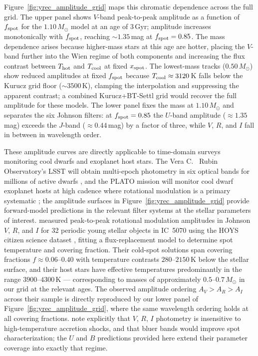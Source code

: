 \documentclass[linenumbers,apj,twocolumn, floatfix]{aastex701}
\begin{document}
Figure~\ref{fig:yrec_amplitude_grid} maps this chromatic dependence across the full grid.
The upper panel shows $V$-band peak-to-peak amplitude as a function of $f_{\rm spot}$ for the $1.10\,M_\odot$ model at an age of 3\,Gyr; amplitude increases monotonically with $f_{\rm spot}$, reaching $\sim 1.35$\,mag at $f_{\rm spot} = 0.85$.
The mass dependence arises because higher-mass stars at this age are hotter, placing the $V$-band further into the Wien regime of both components and increasing the flux contrast between $T_{\rm hot}$ and $T_{\rm cool}$ at fixed $x_{\rm spot}$.
The lowest-mass tracks ($0.50\,M_\odot$) show reduced amplitudes at fixed $f_{\rm spot}$ because $T_{\rm cool} \approx 3120$\,K falls below the Kurucz grid floor ($\sim 3500$\,K), clamping the interpolation and suppressing the apparent contrast; a combined Kurucz+BT-Settl grid would recover the full amplitude for these models.
The lower panel fixes the mass at $1.10\,M_\odot$ and separates the six Johnson filters: at $f_{\rm spot} = 0.85$ the $U$-band amplitude ($\approx 1.35$\,mag) exceeds the $J$-band ($\approx 0.44$\,mag) by a factor of three, while $V$, $R$, and $I$ fall in between in wavelength order.

These amplitude curves are directly applicable to time-domain surveys monitoring cool dwarfs and exoplanet host stars.
The Vera C.
\ Rubin Observatory's LSST will obtain multi-epoch photometry in six optical bands for millions of active dwarfs \citep{LSST}, and the PLATO mission will monitor cool dwarf exoplanet hosts at high cadence where rotational modulation is a primary systematic \citep{plato}; the amplitude surfaces in Figure~\ref{fig:yrec_amplitude_grid}
provide forward-model predictions in the relevant filter systems at the stellar parameters of interest.
\citet{Herbert2024}
measured peak-to-peak rotational modulation amplitudes in Johnson $V$, $R$, and $I$ for 32 periodic young stellar objects in IC~5070 using the HOYS citizen science dataset \citep{Froebrich2018}, fitting a flux-replacement model to determine spot temperature and covering fraction.
Their cold-spot solutions span covering fractions $f \approx 0.06$--$0.40$ with temperature contrasts $280$--$2150$\,K below the stellar surface, and their host stars have effective temperatures predominantly in the range $3900$--$4300$\,K --- corresponding to masses of approximately $0.5$--$0.7\,M_\odot$ in our grid at the relevant ages.
The observed amplitude ordering $A_V > A_R > A_I$ across their sample is directly reproduced by our lower panel of Figure~\ref{fig:yrec_amplitude_grid}, where the same wavelength ordering holds at all covering fractions.
\citet{Herbert2024}
note explicitly that $V$, $R$, $I$ photometry is insensitive to high-temperature accretion shocks, and that bluer bands would improve spot characterization; the $U$ and $B$ predictions provided here extend their parameter coverage into exactly that regime.
\end{document}
